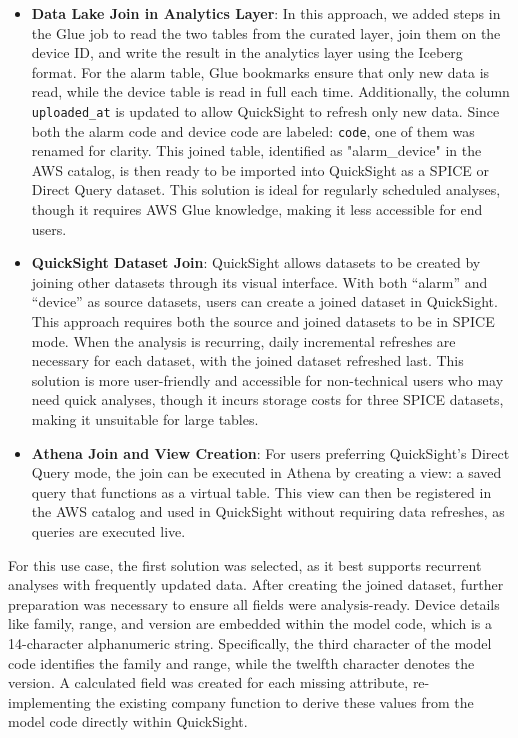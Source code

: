 \begin{itemize}
    \item \textbf{Data Lake Join in Analytics Layer}: In this approach, we added steps in the Glue job to read the two tables from the curated layer, join them on the device ID, and write the result in the analytics layer using the Iceberg format. For the alarm table, Glue bookmarks ensure that only new data is read, while the device table is read in full each time. Additionally, the column \texttt{uploaded\_at} is updated to allow QuickSight to refresh only new data. Since both the alarm code and device code are labeled: \texttt{code}, one of them was renamed for clarity. This joined table, identified as "alarm\_device" in the \ac{AWS} catalog, is then ready to be imported into QuickSight as a SPICE or Direct Query dataset. This solution is ideal for regularly scheduled analyses, though it requires \ac{AWS} Glue knowledge, making it less accessible for end users.
    
    \item \textbf{QuickSight Dataset Join}: QuickSight allows datasets to be created by joining other datasets through its visual interface. With both “alarm” and “device” as source datasets, users can create a joined dataset in QuickSight. This approach requires both the source and joined datasets to be in SPICE mode. When the analysis is recurring, daily incremental refreshes are necessary for each dataset, with the joined dataset refreshed last. This solution is more user-friendly and accessible for non-technical users who may need quick analyses, though it incurs storage costs for three SPICE datasets, making it unsuitable for large tables.

    \item \textbf{Athena Join and View Creation}: For users preferring QuickSight's Direct Query mode, the join can be executed in Athena by creating a view: a saved query that functions as a virtual table. This view can then be registered in the \ac{AWS} catalog and used in QuickSight without requiring data refreshes, as queries are executed live.
\end{itemize}

For this use case, the first solution was selected, as it best supports recurrent analyses with frequently updated data. After creating the joined dataset, further preparation was necessary to ensure all fields were analysis-ready. Device details like family, range, and version are embedded within the model code, which is a 14-character alphanumeric string. Specifically, the third character of the model code identifies the family and range, while the twelfth character denotes the version. A calculated field was created for each missing attribute, re-implementing the existing company function to derive these values from the model code directly within QuickSight.

